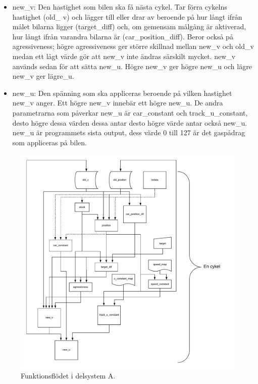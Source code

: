 \begin{itemize}
      \item new\_v: Den hastighet som bilen ska få nästa cykel. Tar förra
        cykelns hastighet (old\_ v) och lägger till eller drar av beroende på
        hur långt ifrån målet bilarna ligger (target\_diff) och, om gemensam
        målgång är aktiverad, hur långt ifrån varandra bilarna är
        (car\_position\_diff). Beror också på agressiveness; högre
        agressiveness ger större skillnad mellan new\_v och old\_v medan ett
        lågt värde gör att new\_v inte ändras särskilt mycket.  new\_v används
        sedan för att sätta new\_u. Högre new\_v ger högre new\_u och lägre
        new\_v ger lägre\_u. 
	
      \item new\_u: Den spänning som ska appliceras beroende på vilken
        hastighet new\_v anger. Ett högre new\_v innebär ett högre new\_u. De
        andra parametrarna som påverkar new\_u är car\_constant och
        track\_u\_constant, desto högre dessa värden dessa antar desto högre
        värde antar också new\_u.  new\_u är programmets sista output, dess
        värde 0 till 127 är det gaspådrag som appliceras på bilen.
    
    \end{itemize}

    \begin{figure}
      \centering
      \includegraphics[width=\linewidth]{figures/flow.pdf}
      \caption{Funktionsflödet i delsystem A.}%
      \label{fig:flow_diagram}
    \end{figure}

